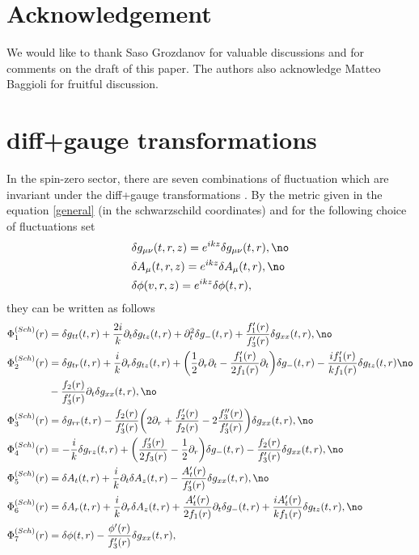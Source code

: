 \documentclass[preprintnumbers,aps,prd,longbibliography,nofootinbib,nobibnotes,amsmath,amssymb]{revtex4}
\begin{document}
\section*{Acknowledgement}
We would like to thank Saso Grozdanov for valuable discussions and for comments on the draft of this paper. The authors also acknowledge Matteo Baggioli  for fruitful discussion.

\appendix
\section{diff+gauge transformations}\label{Appendix1}
In the spin-zero sector, there are seven combinations of fluctuation which are invariant under the diff+gauge transformations \cite{Jansen:2019wag}. By the metric given in the equation \eqref{general} (in the schwarzschild coordinates) and for the following choice of fluctuations set
\begin{align}
	&\delta g_{\mu \nu}(t, r, z) = e^{ i k z} \delta g_{\mu \nu}(t, r), \no\\
	&\delta A_{\mu }(t, r, z) = e^{ i k z} \delta A_{\mu }(t, r),\no\\
	&\delta \phi(v, r, z) = e^{ i k z} \delta \phi(t, r),
\end{align}
they can be written as follows
\begin{align}\label{invsch}
	\Phi_1^{(Sch)}(r) &= \delta g_{t t}(t, r) + \frac{2 i}{k} \partial_t \delta g_{t z}(t, r) + \partial_t^2 \delta g_-(t, r) + \frac{f_1'(r)}{f_3'(r)} \delta g_{x x}(t, r),\no\\
	\Phi_2^{(Sch)}(r) &= \delta g_{t r}(t, r) + \frac{i}{k} \partial_r \delta g_{t z}(t, r) + \bigg(\frac{1}{2} \partial_r \partial_t - \frac{f_1'(r)}{2 f_1(r)} \partial_t\bigg)\delta g_-(t, r) - \frac{i f_1'(r)}{k f_1(r)} \delta g_{t z}(t, r)\no\\
	&  - \frac{f_2(r)}{f_3'(r)} \partial_t \delta g_{x x}(t, r),\no\\
	\Phi_3^{(Sch)}(r) &= \delta g_{r r}(t, r) - \frac{ f_2(r)}{f_3'(r)} \bigg(2 \partial_r + \frac{f_2'(r)}{f_2(r)}  - 2 \frac{f_3''(r)}{f_3'(r)}\bigg)\delta g_{x x}(t, r),\no\\
	\Phi_4^{(Sch)}(r) &= - \frac{i}{k} \delta g_{r z}(t, r)  +\bigg( \frac{f_3'(r)}{2 f_3(r)} - \frac{1}{2} \partial_r \bigg)\delta g_-(t, r) - \frac{f_2(r)}{f_3'(r)} \delta g_{x x}(t, r),\no\\
	\Phi_5^{(Sch)}(r) &= \delta A_t(t, r) + \frac{i}{k} \partial_t \delta A_z(t, r) - \frac{A_t'(r)}{f_3'(r)} \delta g_{x x}(t, r),\no\\
	\Phi_6^{(Sch)}(r) &= \delta A_r(t, r) + \frac{i}{k} \partial_r \delta A_z(t, r) + \frac{A_t'(r)}{2 f_1(r)} \partial_t \delta g_-(t, r) + \frac{i A_t'(r)}{k f_1(r)} \delta g_{t z}(t, r),\no\\
	\Phi_7^{(Sch)}(r) &= \delta \phi(t, r) - \frac{\phi'(r)}{f_3'(r)} \delta g_{x x}(t, r),
\end{align} 
\end{document}
